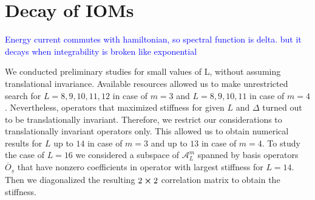\chapter{Decay of IOMs}
\thispagestyle{chapterBeginStyle}


\textcolor{blue}{Energy current commutes with hamiltonian, so spectral function is delta.
but it decays when integrability is broken like exponential}


We conducted preliminary studies for small values of L, without assuming translational invariance. Available resources
allowed us to make unrestricted search for \(L = 8,9,10,11,12\) in case of \(m = 3\) and \(L = 8,9,10,11\) in case of
\(m = 4\). Nevertheless, operators that maximized stiffness for given \(L\) and \(\Delta \) turned out to be translationally
invariant. Therefore, we restrict our considerations to translationally invariant operators only. This allowed us
to obtain numerical results for \(L\) up to \(14\) in case of \(m = 3\) and up to \(13\) in case of \(m = 4\).
To study the case of  \(L = 16\) we considered a subspace of \(\mathcal{A}_L^m\) spanned by basis operators
\(\overline{O}_{\underline{s}}\) that have nonzero coefficients in operator with largest stiffness for \(L = 14\). 
Then we diagonalized the resulting \(2\cross 2\) correlation matrix to obtain the stiffness.

